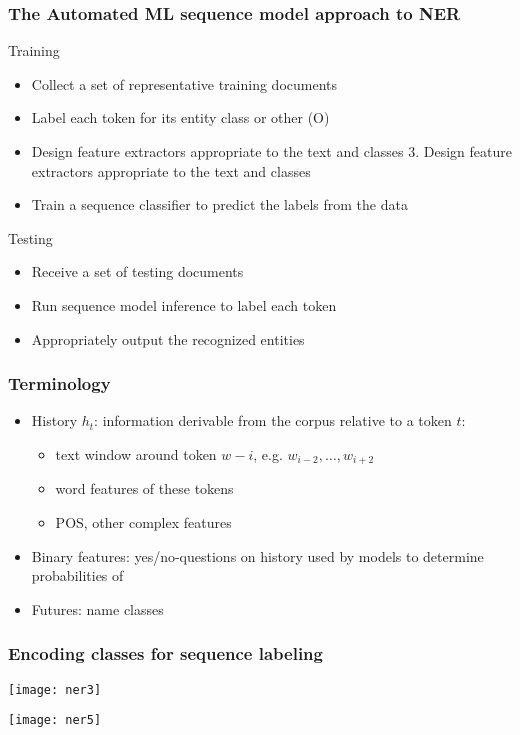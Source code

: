 \begin{frame}[fragile]\frametitle{The Automated ML sequence model approach to NER}
Training
  \begin{itemize}
  \item  Collect a set of representative training documents
  \item  Label each token for its entity class or other (O)
  \item  Design feature extractors appropriate to the text and classes 3. Design feature extractors appropriate to the text and classes
  \item  Train a sequence classifier to predict the labels from the data
  \end{itemize}
Testing  
  \begin{itemize}
  \item  Receive a set of testing documents
  \item  Run sequence model inference to label each token
  \item  Appropriately output the recognized entities
  \end{itemize}
\end{frame}

\begin{frame}[fragile]\frametitle{Terminology}
  \begin{itemize}
  \item History $h_t$: information derivable from the corpus relative to a token $t$:
    \begin{itemize}
  \item text window around token $w-i$, e.g. $w_{i-2},\ldots,w_{i+2}$
  \item word features of these tokens
  \item POS, other complex features
    \end{itemize}
  \item Binary features: yes/no-questions on history used by models to determine probabilities of
  \item Futures: name classes

  \end{itemize}
\end{frame}

\begin{frame}[fragile]\frametitle{Encoding classes for sequence labeling}

\begin{center}
\texttt{[image: ner3]}

\texttt{[image: ner5]}
\end{center}
\end{frame}

